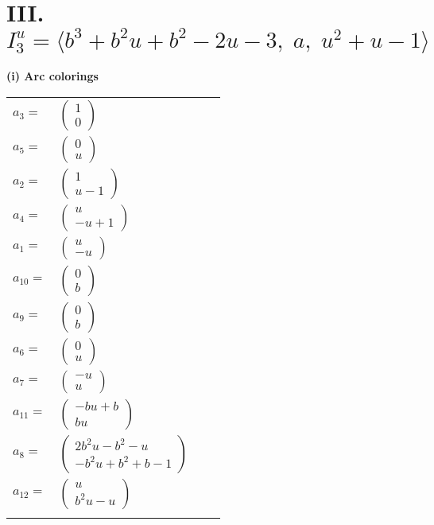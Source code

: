 \documentclass[1p]{elsarticle_modified}
\theoremstyle{definition}
\begin{document}
\centering \section*{III. $I^u_{3}= \langle b^3+b^2 u+b^2-2 u-3,\;a,\;u^2+u-1 \rangle$}
\flushleft \textbf{(i) Arc colorings}\\
\begin{tabular}{m{7pt} m{180pt} m{7pt} m{180pt} }
\flushright $a_{3}=$&$\begin{pmatrix}1\\0\end{pmatrix}$ \\
\flushright $a_{5}=$&$\begin{pmatrix}0\\u\end{pmatrix}$ \\
\flushright $a_{2}=$&$\begin{pmatrix}1\\u-1\end{pmatrix}$ \\
\flushright $a_{4}=$&$\begin{pmatrix}u\\- u+1\end{pmatrix}$ \\
\flushright $a_{1}=$&$\begin{pmatrix}u\\- u\end{pmatrix}$ \\
\flushright $a_{10}=$&$\begin{pmatrix}0\\b\end{pmatrix}$ \\
\flushright $a_{9}=$&$\begin{pmatrix}0\\b\end{pmatrix}$ \\
\flushright $a_{6}=$&$\begin{pmatrix}0\\u\end{pmatrix}$ \\
\flushright $a_{7}=$&$\begin{pmatrix}- u\\u\end{pmatrix}$ \\
\flushright $a_{11}=$&$\begin{pmatrix}- b u+b\\b u\end{pmatrix}$ \\
\flushright $a_{8}=$&$\begin{pmatrix}2 b^2 u- b^2- u\\- b^2 u+b^2+b-1\end{pmatrix}$ \\
\flushright $a_{12}=$&$\begin{pmatrix}u\\b^2 u- u\end{pmatrix}$\\&\end{tabular}
\end{document}
